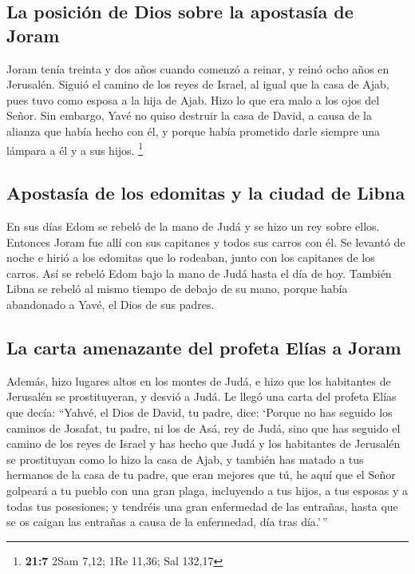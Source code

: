 \hypertarget{la-posiciuxf3n-de-dios-sobre-la-apostasuxeda-de-joram}{%
\subsection{La posición de Dios sobre la apostasía de
Joram}\label{la-posiciuxf3n-de-dios-sobre-la-apostasuxeda-de-joram}}

 Joram tenía treinta y dos años cuando comenzó a reinar, y
reinó ocho años en Jerusalén.  Siguió el camino de los
reyes de Israel, al igual que la casa de Ajab, pues tuvo como esposa a
la hija de Ajab. Hizo lo que era malo a los ojos del Señor.
 Sin embargo, Yavé no quiso destruir la casa de David, a
causa de la alianza que había hecho con él, y porque había prometido
darle siempre una lámpara a él y a sus hijos. \footnote{\textbf{21:7}
  2Sam 7,12; 1Re 11,36; Sal 132,17}

\hypertarget{apostasuxeda-de-los-edomitas-y-la-ciudad-de-libna}{%
\subsection{Apostasía de los edomitas y la ciudad de
Libna}\label{apostasuxeda-de-los-edomitas-y-la-ciudad-de-libna}}

 En sus días Edom se rebeló de la mano de Judá y se hizo
un rey sobre ellos.  Entonces Joram fue allí con sus
capitanes y todos sus carros con él. Se levantó de noche e hirió a los
edomitas que lo rodeaban, junto con los capitanes de los carros.
 Así se rebeló Edom bajo la mano de Judá hasta el día de
hoy. También Libna se rebeló al mismo tiempo de debajo de su mano,
porque había abandonado a Yavé, el Dios de sus padres.

\hypertarget{la-carta-amenazante-del-profeta-eluxedas-a-joram}{%
\subsection{La carta amenazante del profeta Elías a
Joram}\label{la-carta-amenazante-del-profeta-eluxedas-a-joram}}

 Además, hizo lugares altos en los montes de Judá, e hizo
que los habitantes de Jerusalén se prostituyeran, y desvió a Judá.
 Le llegó una carta del profeta Elías que decía: ``Yahvé,
el Dios de David, tu padre, dice: `Porque no has seguido los caminos de
Josafat, tu padre, ni los de Asá, rey de Judá,  sino que
has seguido el camino de los reyes de Israel y has hecho que Judá y los
habitantes de Jerusalén se prostituyan como lo hizo la casa de Ajab, y
también has matado a tus hermanos de la casa de tu padre, que eran
mejores que tú,  he aquí que el Señor golpeará a tu
pueblo con una gran plaga, incluyendo a tus hijos, a tus esposas y a
todas tus posesiones;  y tendréis una gran enfermedad de
las entrañas, hasta que se os caigan las entrañas a causa de la
enfermedad, día tras día.'\,''

